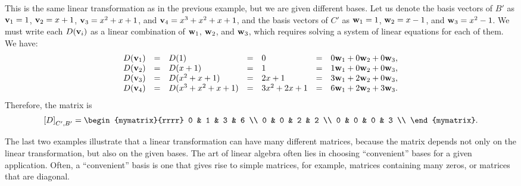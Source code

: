 \begin{solution}
  This is the same linear transformation as in the previous example,
  but we are given different bases. Let us denote the basis vectors of
  $B'$ as $\vect{v}_1 = 1$, $\vect{v}_2 = x+1$, $\vect{v}_3 = x^2+x+1$, and
  $\vect{v}_4=x^3+x^2+x+1$, and the basis vectors of $C'$ as $\vect{w}_1 = 1$,
  $\vect{w}_2 = x-1$, and $\vect{w}_3 = x^2-1$. We must write each
  $D(\vect{v}_i)$ as a linear combination of $\vect{w}_1$,
  $\vect{w}_2$, and $\vect{w}_3$, which requires solving a system of
  linear equations for each of them. We have:
  \begin{equation*}
    \begin{array}{rclclcl}
      D(\vect{v}_1) &=& D(1) &=& 0 &=& 0\vect{w}_1 + 0\vect{w}_2 + 0\vect{w}_3, \\
      D(\vect{v}_2) &=& D(x+1) &=& 1 &=& 1\vect{w}_1 + 0\vect{w}_2 + 0\vect{w}_3, \\
      D(\vect{v}_3) &=& D(x^2+x+1) &=& 2x+1 &=& 3\vect{w}_1 + 2\vect{w}_2 + 0\vect{w}_3, \\
      D(\vect{v}_4) &=& D(x^3+x^2+x+1) &=& 3x^2+2x+1 &=& 6\vect{w}_1 + 2\vect{w}_2 + 3\vect{w}_3. \\
    \end{array}
  \end{equation*}
  Therefore, the matrix is
  \begin{equation*}
    \coord{D}_{C',B'} =
    \begin{mymatrix}{rrrr}
      0 & 1 & 3 & 6 \\
      0 & 0 & 2 & 2 \\
      0 & 0 & 0 & 3 \\
    \end{mymatrix}.
  \end{equation*}
\end{solution}

The last two examples illustrate that a linear transformation can have
many different matrices, because the matrix depends not only on the
linear transformation, but also on the given bases. The art of linear
algebra often lies in choosing ``convenient'' bases for a given
application. Often, a ``convenient'' basis is one that gives rise to
simple matrices, for example, matrices containing many zeros, or
matrices that are diagonal.

